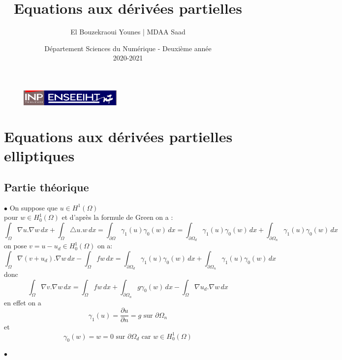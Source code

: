 \documentclass{article}
\begin{document}
\begin{figure}[t]
\centering
\includegraphics[width=5cm]{inp_n7.png}
\end{figure}

\title{\vspace{4cm} \textbf{Equations aux dérivées partielles}}
\author{El Bouzekraoui Younes | MDAA Saad}
\date{\vspace{7cm} Département Sciences du Numérique - Deuxième année \\
2020-2021 }

\maketitle

\newpage
\tableofcontents

\newpage
\section{Equations aux dérivées partielles elliptiques}
\subsection{Partie théorique}
$\bullet$ On suppose que $u \in H^{1}(\Omega)$ \\
pour $w \in H_{0}^{1}(\Omega)$ et d'après la formule de Green on a :
$$
\int_{\Omega} \nabla u . \nabla w \,dx + \int_{\Omega} \triangle u . w \,dx = \int_{\partial \Omega} \gamma_{1}(u) \gamma_{0}(w) \,dx = \int_{\partial \Omega_{d}} \gamma_{1}(u) \gamma_{0}(w) \,dx + \int_{\partial \Omega_{n}} \gamma_{1}(u) \gamma_{0}(w) \,dx 
$$
on pose $v = u - u_d \in H_{0}^{1}(\Omega)$ on a:
$$
\int_{\Omega} \nabla (v + u_d) . \nabla w \,dx - \int_{\Omega} f w \,dx = \int_{\partial \Omega_{d}} \gamma_{1}(u) \gamma_{0}(w) \,dx + \int_{\partial \Omega_{n}} \gamma_{1}(u) \gamma_{0}(w) \,dx 
$$
donc
$$
\int_{\Omega} \nabla v . \nabla w \,dx = \int_{\Omega} f w \,dx + \int_{\partial \Omega_{n}} g \gamma_{0}(w) \,dx - \int_{\Omega} \nabla u_d . \nabla w \,dx
$$
en effet on a
$$
\gamma_1(u) = \frac{\partial u}{\partial n} = g \textrm{ sur } \partial \Omega_{n}
$$
et
$$
\gamma_0(w) = w = 0 \textrm{ sur } \partial \Omega_{d} \textrm{ car } w \in H_{0}^{1}(\Omega)
$$

$\bullet$
\end{document}
